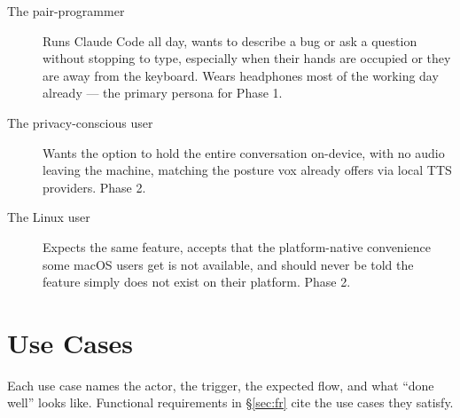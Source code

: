\documentclass[a4paper,11pt]{report}
\begin{document}
\begin{description}
  \item[The pair-programmer] Runs Claude Code all day, wants to describe a
    bug or ask a question without stopping to type, especially when their
    hands are occupied or they are away from the keyboard. Wears
    headphones most of the working day already --- the primary persona for
    Phase 1.
  \item[The privacy-conscious user] Wants the option to hold the entire
    conversation on-device, with no audio leaving the machine, matching the
    posture vox already offers via local TTS providers. Phase 2.
  \item[The Linux user] Expects the same feature, accepts that the
    platform-native convenience some macOS users get is not available, and
    should never be told the feature simply does not exist on their
    platform. Phase 2.
\end{description}

\section{Use Cases}

Each use case names the actor, the trigger, the expected flow, and what
``done well'' looks like. Functional requirements in \S\ref{sec:fr} cite the
use cases they satisfy.
\end{document}
